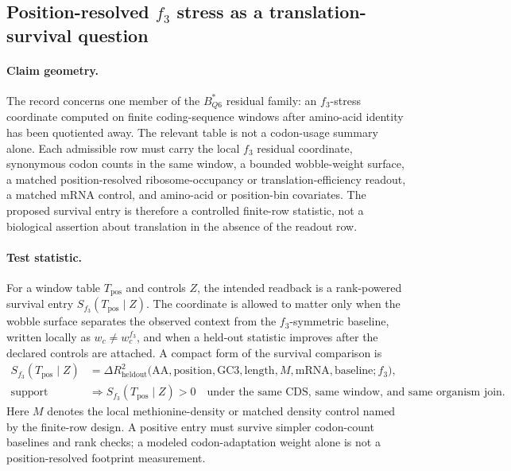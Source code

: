 \subsection{Position-resolved $f_3$ stress as a translation-survival question}
\label{sec:q6-f3-stress-position-resolved-translation-survival-cross-layer}

\paragraph{Claim geometry.}
The record concerns one member of the $B^*_{Q6}$ residual family: an $f_3$-stress coordinate computed on finite coding-sequence windows after amino-acid identity has been quotiented away.  The relevant table is not a codon-usage summary alone.  Each admissible row must carry the local $f_3$ residual coordinate, synonymous codon counts in the same window, a bounded wobble-weight surface, a matched position-resolved ribosome-occupancy or translation-efficiency readout, a matched mRNA control, and amino-acid or position-bin covariates.  The proposed survival entry is therefore a controlled finite-row statistic, not a biological assertion about translation in the absence of the readout row.

\paragraph{Test statistic.}
For a window table $T_{\mathrm{pos}}$ and controls $Z$, the intended readback is a rank-powered survival entry $S_{f_3}(T_{\mathrm{pos}}\mid Z)$.  The coordinate is allowed to matter only when the wobble surface separates the observed context from the $f_3$-symmetric baseline, written locally as $w_c \ne w^{f_3}_c$, and when a held-out statistic improves after the declared controls are attached.  A compact form of the survival comparison is
$$
\begin{aligned}
S_{f_3}(T_{\mathrm{pos}}\mid Z)
  &= \Delta R^2_{\mathrm{heldout}}\bigl(\mathrm{AA},\mathrm{position},\mathrm{GC3},\mathrm{length},M,\mathrm{mRNA},\mathrm{baseline}; f_3\bigr),\\
\mathrm{support} &\Longrightarrow S_{f_3}(T_{\mathrm{pos}}\mid Z)>0
\quad \text{under the same CDS, same window, and same organism join.}
\end{aligned}
$$
Here $M$ denotes the local methionine-density or matched density control named by the finite-row design.  A positive entry must survive simpler codon-count baselines and rank checks; a modeled codon-adaptation weight alone is not a position-resolved footprint measurement.

